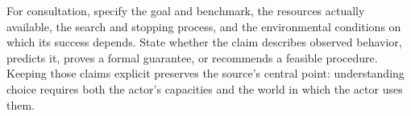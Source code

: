 For consultation, specify the goal and benchmark, the resources actually
available, the search and stopping process, and the environmental conditions
on which its success depends. State whether the claim describes observed
behavior, predicts it, proves a formal guarantee, or recommends a feasible
procedure. Keeping those claims explicit preserves the source's central
point: understanding choice requires both the actor's capacities and the
world in which the actor uses them.
